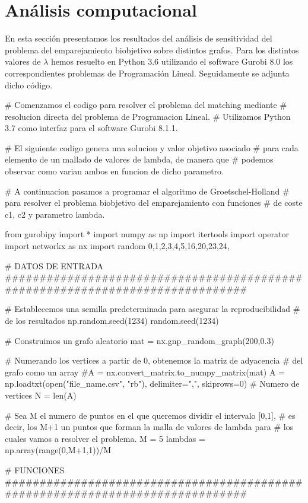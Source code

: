 \documentclass[twoside,a4paper,openright,12pt,tikz]{book}
\begin{document}
\chapter{Análisis computacional}
En esta sección presentamos los resultados del análisis de sensitividad del problema del emparejamiento biobjetivo sobre distintos grafos. Para los distintos valores de $\lambda$ hemos resuelto en Python 3.6 utilizando el software Gurobi 8.0 los correspondientes problemas de Programación Lineal. Seguidamente se adjunta dicho código.
\newline
\begin{pythone}# Comenzamos el codigo para resolver el problema del matching mediante 
# resolucion directa del problema de Programacion Lineal.
# Utilizamos Python 3.7 como interfaz para el software Gurobi 8.1.1.

# El siguiente codigo genera una solucion y valor objetivo asociado
# para cada elemento de un mallado de valores de lambda, de manera que
# podemos observar como varian ambos en funcion de dicho parametro.

# A continuacion pasamos a programar el algoritmo de Groetschel-Holland 
# para resolver el problema biobjetivo del emparejamiento con funciones
# de coste c1, c2 y parametro lambda.

from gurobipy import *
import numpy as np
import itertools 
import operator
import networkx as nx
import random 
0,1,2,3,4,5,16,20,23,24,

# DATOS DE ENTRADA
##############################################################################

# Establecemos una semilla predeterminada para asegurar la reproducibilidad
# de los resultados
np.random.seed(1234)
random.seed(1234)

# Construimos un grafo aleatorio
mat = nx.gnp_random_graph(200,0.3)

# Numerando los vertices a partir de 0, obtenemos la matriz de adyacencia
# del grafo como un array 
#A = nx.convert_matrix.to_numpy_matrix(mat)
A = np.loadtxt(open("file_name.csv", "rb"), delimiter=",", skiprows=0)
# Numero de vertices
N = len(A)

# Sea M el numero de puntos en el que queremos dividir el intervalo [0,1],
# es decir, los M+1 un puntos que forman la malla de valores de lambda para
# los cuales vamos a resolver el problema.
M = 5
lambdas = np.array(range(0,M+1,1))/M

# FUNCIONES 
##############################################################################


\end{pythone}
\end{document}
